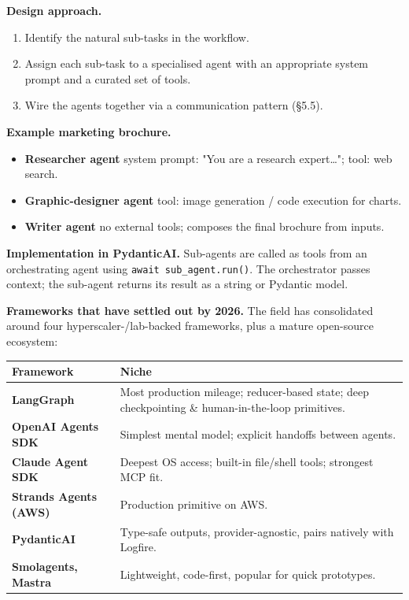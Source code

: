 \documentclass[a4paper,11pt]{article}
\begin{document}
\textbf{Design approach.}
\begin{enumerate}[noitemsep, leftmargin=1.4em]
  \item Identify the natural sub-tasks in the workflow.
  \item Assign each sub-task to a specialised agent with an
        appropriate system prompt and a curated set of tools.
  \item Wire the agents together via a communication pattern (§5.5).
\end{enumerate}

\textbf{Example \textemdash{} marketing brochure.}
\begin{itemize}[noitemsep, leftmargin=1.2em]
  \item \textbf{Researcher agent} \textemdash{} system prompt:
        "You are a research expert\dots"; tool: web search.
  \item \textbf{Graphic-designer agent} \textemdash{} tool: image
        generation / code execution for charts.
  \item \textbf{Writer agent} \textemdash{} no external tools;
        composes the final brochure from inputs.
\end{itemize}

\textbf{Implementation in PydanticAI.}
Sub-agents are called as tools from an orchestrating agent using
\texttt{await sub\_agent.run()}. The orchestrator passes context;
the sub-agent returns its result as a string or Pydantic model.

\textbf{Frameworks that have settled out by 2026.} The field has
consolidated around four hyperscaler-/lab-backed frameworks, plus a
mature open-source ecosystem:

\begin{center}\small
\begin{tabular}{p{3.6cm} p{9.4cm}}
  \toprule
  \textbf{Framework} & \textbf{Niche} \\
  \midrule
  \textbf{LangGraph}            & Most production mileage; reducer-based state; deep checkpointing \& human-in-the-loop primitives. \\
  \textbf{OpenAI Agents SDK}    & Simplest mental model; explicit handoffs between agents. \\
  \textbf{Claude Agent SDK}     & Deepest OS access; built-in file/shell tools; strongest MCP fit. \\
  \textbf{Strands Agents (AWS)} & Production primitive on AWS. \\
  \textbf{PydanticAI}           & Type-safe outputs, provider-agnostic, pairs natively with Logfire. \\
  \textbf{Smolagents, Mastra}   & Lightweight, code-first, popular for quick prototypes. \\
  \bottomrule
\end{tabular}
\end{center}
\end{document}
